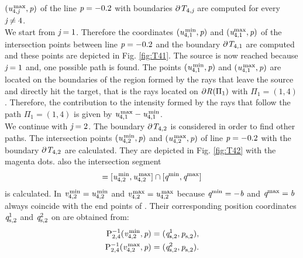 $(\textit{u}_{4,\textit{j}}^\textrm{\,max}, \textit{p})$
of the line $\textit{p}= -0.2$
 with boundaries $\partial\mbox{$\emph{T}_{\textit{$4$,\textit{j}}}$}$ are computed for every $\textit{j}\neq 4$. \\ \indent
We start from $\textit{j}=1$. Therefore the coordinates  $(\textit{u}_{4,1}^\textrm{\,min}, \textit{p})$ and
$(\textit{u}_{4,1}^\textrm{max}, \textit{p})$ of the intersection points between line $\textit{p} = -0.2$ and the boundary $\partial\mbox{$\emph{T}_{\textit{$4$,$1$}}$}$ are computed and these points are depicted in Fig. \ref{fig:T41}.
 The source is now reached because $\textit{j} = 1$ and, one possible path is found.
 The points $(\textit{u}_{4,1}^\textrm{\,min}, \textit{p})$
and $(\textit{u}_{4,1}^\textrm{\,max}, \textit{p})$ are located on the boundaries of the region formed by the rays that leave the source and directly hit the target, that is the rays located on
$\partial \mbox{$\emph{R}_{\textit{}}$}(\Pi_1)$ with $\Pi_1 = (1,4)$.
Therefore, the contribution to the intensity formed by the rays that follow the path $\Pi_1 = (1,4)$ is given by 
$\textit{u}_{4,1}^\textrm{\,max}-\textit{u}_{4,1}^\textrm{\,min}$. \\ \indent
We continue with $\textit{j} = 2$. 
The boundary $\partial\mbox{$\emph{T}_{\textit{$4$,$2$}}$}$ is considered in order to find other paths.
The intersection points $(\textit{u}_{4,2}^\textrm{\,min}, \textit{p})$ and
$(\textit{u}_{4,2}^\textrm{\,max}, \textit{p})$ of line
$\textit{p}=-0.2$ with the boundary
$\partial\mbox{$\emph{T}_{\textit{$4$,$2$}}$}$ are calculated.
They are depicted in Fig. \ref{fig:T42} with the magenta dots. also the intersection segment 
\begin{equation}
[\variabile{v}_{4,2}^\textrm{\,min}, \variabile{v}_{4,2}^\textrm{\,max}] = [\variabile{u}_{4,2}^\textrm{\,min}, \variabile{u}_{4,2}^\textrm{\,max}]\cap [\variabile{q}^\textrm{min}, \variabile{q}^\textrm{max}]
\end{equation}
is calculated. In  $\textit{v}_{4,2}^\textrm{\,min} = \textit{u}_{4,2}^\textrm{\,min}$ and $\textit{v}_{4,2}^\textrm{\,max} = \textit{u}_{4,2}^\textrm{\,max}$ because $\textit{q}^\textrm{min} = -\textit{b}$ and $\textit{q}^\textrm{max} = \textit{b}$ always coincide with the end points of .
Their corresponding position coordinates $\textit{q}_{\textrm{s,} \textit{$2$}}^1$ and $\textit{q}_{\textrm{s,} \textit{$2$}}^2$ on 
are obtained from:
\begin{equation}\label{inverseP}
\begin{split}
 \mathrm{P}_{{2,4}}^{-1}
(\textit{v}_{4,2}^\textrm{\,min}, \textit{p}) &=  (\textit{q}_{\textrm{s,} \textit{$2$}}^1, \textit{p}_{\textrm{s,} \textit{$2$}}), \\
 \mathrm{P}_{{2,4}}^{-1}
(\textit{v}_{4,2}^\textrm{\,max}, \textit{p}) &=  (\textit{q}_{\textrm{s,} \textit{$2$}}^2, \textit{p}_{\textrm{s,} \textit{$2$}}).
\end{split}
\end{equation}
